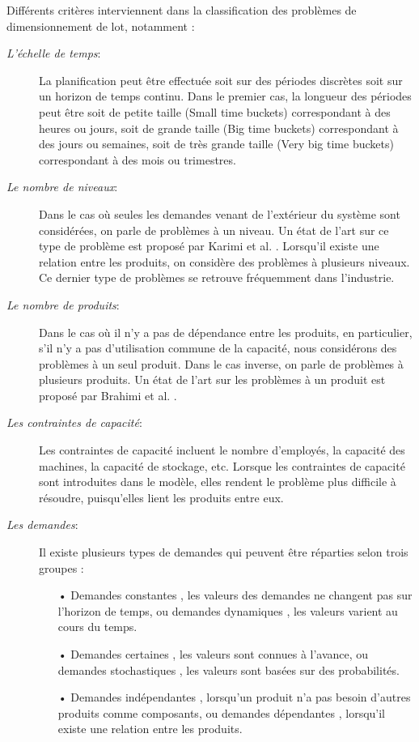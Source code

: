 \documentclass[12pt,a4paper]{article}
\begin{document}
Différents critères interviennent dans la classification des problèmes de dimensionnement de lot, notamment : 
\begin{description}
	\item[\textsl{L'échelle de temps}:] La planification peut être effectuée soit sur des périodes discrètes soit sur un horizon de temps continu. Dans le premier cas, la longueur des périodes peut
être soit de petite taille (Small time buckets) correspondant à des heures ou jours, soit de grande taille (Big time buckets) correspondant à des jours ou semaines, soit de très grande taille (Very big time buckets) correspondant à des mois ou trimestres.

	\item[\textsl{Le nombre de niveaux}:] Dans le cas où seules les demandes venant de l'extérieur du système sont considérées, on parle de problèmes à un niveau. Un état de l'art sur ce type de problème est proposé par Karimi et al. \cite{karimi} . Lorsqu'il existe une relation entre les produits, on considère des problèmes à plusieurs niveaux. Ce dernier type de problèmes se retrouve fréquemment dans l'industrie.

	\item[\textsl{Le nombre de produits}:] Dans le cas où il n'y a pas de dépendance entre les produits, en particulier, s'il n'y a pas d'utilisation commune de la capacité, nous considérons des problèmes à un seul produit. Dans le cas inverse, on parle de problèmes à plusieurs produits. Un état de l'art sur les problèmes à un produit est proposé par Brahimi et al. \cite{brahimi}.

	\item[\textsl{Les contraintes de capacité}:] Les contraintes de capacité incluent le nombre d'employés, la capacité des machines, la capacité de stockage, etc. Lorsque les contraintes de capacité sont
introduites dans le modèle, elles rendent le problème plus difficile à résoudre,
puisqu'elles lient les produits entre eux.

	\item[\textsl{Les demandes}:] Il existe plusieurs types de demandes qui peuvent être réparties selon trois
groupes :
	\begin{itemize}
		\item[•] Demandes constantes , les valeurs des demandes ne changent pas sur l'horizon de temps, ou demandes dynamiques , les valeurs varient au cours du temps.
		\item[•] Demandes certaines , les valeurs sont connues à l'avance, ou demandes stochastiques , les valeurs sont basées sur des probabilités.
		\item[•] Demandes indépendantes , lorsqu'un produit n'a pas besoin d'autres produits comme composants, ou demandes dépendantes , lorsqu'il existe une relation
entre les produits.
	\end{itemize}


\end{description}
\end{document}
